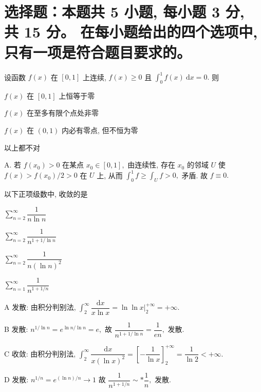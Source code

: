 


\makeexamtitle



\section{%
  选择题：本题共 5 小题, 每小题 3 分, 共 15 分。
  在每小题给出的四个选项中, 只有一项是符合题目要求的。
}



\begin{question}
设函数 $f(x)$ 在 $[0, 1]$ 上连续, $f(x) \geqslant 0$ 且 $\displaystyle \int_0^1 f(x) ~ \mathrm{d}x = 0.$ 则 \paren[A]

\begin{choices}
\item $f(x)$ 在 $[0, 1]$ 上恒等于零
\item $f(x)$ 在至多有限个点处非零
\item $f(x)$ 在 $(0, 1)$ 内必有零点, 但不恒为零
\item 以上都不对
\end{choices}
\end{question}

\begin{solution}
A. 若 $f(x_0) > 0$ 在某点 $x_0 \in [0, 1],$ 由连续性, 存在 $x_0$ 的邻域 $U$ 使 $f(x) > f(x_0)/2 > 0$ 在 $U$ 上, 从而 $\int_0^1 f \geqslant \int_U f > 0,$ 矛盾. 故 $f \equiv 0.$
\end{solution}

\begin{question}
以下正项级数中, 收敛的是 \paren[C]

\begin{choices}
\item $\displaystyle \sum_{n=2}^\infty \dfrac{1}{n \ln n}$
\item $\displaystyle \sum_{n=2}^\infty \dfrac{1}{n^{1 + 1/\ln n}}$
\item $\displaystyle \sum_{n=2}^\infty \dfrac{1}{n (\ln n)^2}$
\item $\displaystyle \sum_{n=1}^\infty \dfrac{1}{n^{1 + 1/n}}$
\end{choices}
\end{question}

\begin{solution}
A 发散: 由积分判别法, $\displaystyle\int_2^\infty \dfrac{\mathrm{d}x}{x \ln x} = \ln \ln x \big|_2^{+\infty} = +\infty.$

B 发散: $n^{1/\ln n} = e^{\ln n / \ln n} = e,$ 故 $\dfrac{1}{n^{1+1/\ln n}} = \dfrac{1}{en},$ 发散.

C 收敛: 由积分判别法, $\displaystyle\int_2^\infty \dfrac{\mathrm{d}x}{x(\ln x)^2} = \left[ -\dfrac{1}{\ln x} \right]_2^{+\infty} = \dfrac{1}{\ln 2} < +\infty.$

D 发散: $n^{1/n} = e^{(\ln n)/n} \to 1$ 故 $\dfrac{1}{n^{1+1/n}} \sim* \dfrac{1}{n},$ 发散.
\end{solution}

